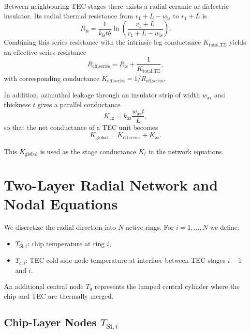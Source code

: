 \documentclass[conference]{IEEEtran}
\begin{document}
Between neighbouring TEC stages there exists a radial ceramic or dielectric insulator. Its radial thermal resistance from $r_1 + L - w_{\text{is}}$ to $r_1 + L$ is
\begin{equation}
	R_{\text{is}} = \frac{1}{k_{\text{is}} t \theta} \ln \left( \frac{r_1 + L}{r_1 + L - w_{\text{is}}} \right).
	\label{eq:R_is}
\end{equation}
Combining this series resistance with the intrinsic leg conductance $K_{\text{total,TE}}$ yields an effective series resistance
\begin{equation}
	R_{\text{eff,series}} = R_{\text{is}} + \frac{1}{K_{\text{total,TE}}},
	\label{eq:R_eff_series}
\end{equation}
with corresponding conductance $K_{\text{eff,series}} = 1 / R_{\text{eff,series}}$.

In addition, azimuthal leakage through an insulator strip of width $w_{\text{az}}$ and thickness $t$ gives a parallel conductance
\begin{equation}
	K_{\text{az}} = k_{\text{az}} \frac{w_{\text{az}} t}{L},
	\label{eq:K_az}
\end{equation}
so that the net conductance of a TEC unit becomes
\begin{equation}
	K_{\text{global}} = K_{\text{eff,series}} + K_{\text{az}}.
	\label{eq:K_global}
\end{equation}

This $K_{\text{global}}$ is used as the stage conductance $K_i$ in the network equations.

\section{Two-Layer Radial Network and Nodal Equations}

We discretize the radial direction into $N$ active rings. For $i=1,\dots,N$ we define:
\begin{itemize}
	\item $T_{\text{Si},i}$: chip temperature at ring $i$,
	\item $T_{c,i}$: TEC cold-side node temperature at interface between TEC stages $i-1$ and $i$.
\end{itemize}
An additional central node $T_0$ represents the lumped central cylinder where the chip and TEC are thermally merged.

\subsection{Chip-Layer Nodes $T_{\text{Si},i}$}
\end{document}
